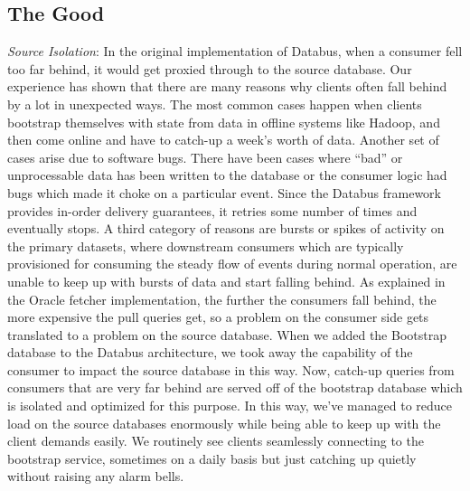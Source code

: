 \subsection{The Good}
\begin{itemize*}
\item \emph{Source Isolation}: In the original implementation of Databus, when a consumer fell too far behind, it would get proxied through to the source database. Our experience has shown that there are many reasons why clients often fall behind by a lot in unexpected ways. The most common cases happen when clients bootstrap themselves with state from data in offline systems like Hadoop, and then come online and have to catch-up a week's worth of data. Another set of cases arise due to software bugs. There have been cases where ``bad'' or unprocessable data has been written to the database or the consumer logic had bugs which made it choke on a particular event. Since the Databus framework provides in-order delivery guarantees, it retries some number of times and eventually stops. 
A third category of reasons are bursts or spikes of activity on the primary datasets, where downstream consumers which are typically provisioned for consuming the steady flow of events during normal operation, are unable to keep up with bursts of data and start falling behind. As explained in the Oracle fetcher implementation, the further the consumers fall behind, the more expensive the pull queries get, so a problem on the consumer side gets translated to a problem on the source database. When we added the Bootstrap database to the Databus architecture, we took away the capability of the consumer to impact the source database in this way. Now, catch-up queries from consumers that are very far behind are served off of the bootstrap database which is isolated and optimized for this purpose. In this way, we've managed to reduce load on the source databases enormously while being able to keep up with the client demands easily.  We routinely see clients seamlessly connecting to the bootstrap service, sometimes on a daily basis but just catching up quietly without raising any alarm bells. 

\end{itemize*}
